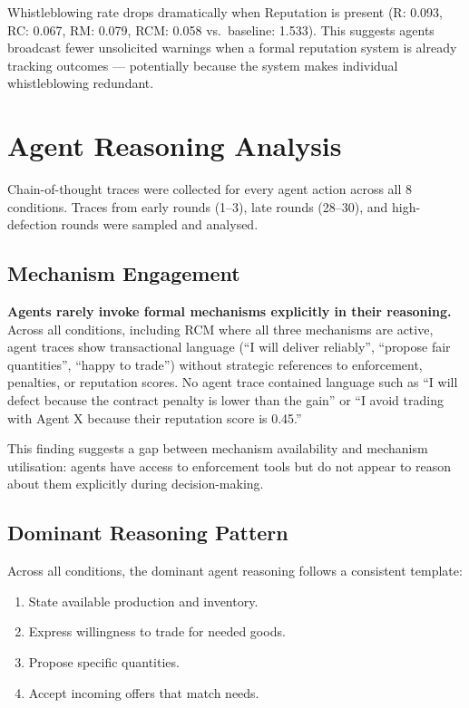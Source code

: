 \documentclass[12pt, a4paper]{article}
\begin{document}
Whistleblowing rate drops dramatically when Reputation is present (R: 0.093, RC: 0.067, RM: 0.079, RCM: 0.058 vs.\ baseline: 1.533). This suggests agents broadcast fewer unsolicited warnings when a formal reputation system is already tracking outcomes — potentially because the system makes individual whistleblowing redundant.

\section{Agent Reasoning Analysis}
\label{sec:reasoning}

Chain-of-thought traces were collected for every agent action across all 8 conditions. Traces from early rounds (1--3), late rounds (28--30), and high-defection rounds were sampled and analysed.

\subsection{Mechanism Engagement}

\textbf{Agents rarely invoke formal mechanisms explicitly in their reasoning.} Across all conditions, including RCM where all three mechanisms are active, agent traces show transactional language (``I will deliver reliably'', ``propose fair quantities'', ``happy to trade'') without strategic references to enforcement, penalties, or reputation scores. No agent trace contained language such as ``I will defect because the contract penalty is lower than the gain'' or ``I avoid trading with Agent X because their reputation score is 0.45.''

This finding suggests a gap between mechanism availability and mechanism utilisation: agents have access to enforcement tools but do not appear to reason about them explicitly during decision-making.

\subsection{Dominant Reasoning Pattern}

Across all conditions, the dominant agent reasoning follows a consistent template:
\begin{enumerate}
  \item State available production and inventory.
  \item Express willingness to trade for needed goods.
  \item Propose specific quantities.
  \item Accept incoming offers that match needs.
\end{enumerate}
\end{document}
